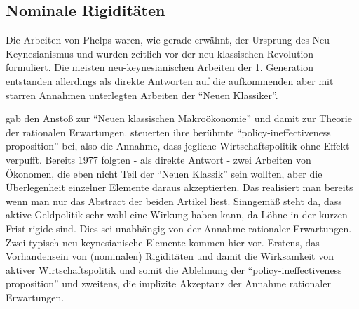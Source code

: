\subsection{Nominale Rigiditäten}
\label{Nominale Rigiditäten}

Die Arbeiten von Phelps waren, wie gerade erwähnt, der Ursprung des Neu-Keynesianismus und wurden zeitlich vor der neu-klassischen Revolution formuliert. Die meisten neu-keynesianischen Arbeiten der 1. Generation entstanden allerdings als direkte Antworten auf die aufkommenden aber mit starren Annahmen unterlegten Arbeiten der "`Neuen Klassiker"'.

\textcite{Lucas1976} gab den Anstoß zur "`Neuen klassischen Makroökonomie"' und damit zur Theorie der rationalen Erwartungen. \textcite{Sargent1975} steuerten ihre berühmte "`policy-ineffectiveness proposition"' bei, also die Annahme, dass jegliche Wirtschaftspolitik ohne Effekt verpufft. Bereits 1977 folgten - als direkte Antwort - zwei Arbeiten \textcite{Taylor1977, Fischer1977} von Ökonomen, die eben nicht Teil der "`Neuen Klassik"' sein wollten, aber die Überlegenheit einzelner Elemente daraus akzeptierten. Das realisiert man bereits wenn man nur das Abstract der beiden Artikel liest. Sinngemäß steht da, dass aktive Geldpolitik sehr wohl eine Wirkung haben kann, da Löhne in der kurzen Frist rigide sind. Dies sei unabhängig von der Annahme rationaler Erwartungen. Zwei typisch neu-keynesianische Elemente kommen hier vor. Erstens, das Vorhandensein von (nominalen) Rigiditäten und damit die Wirksamkeit von aktiver Wirtschaftspolitik und somit die Ablehnung der "`policy-ineffectiveness proposition"' und zweitens, die implizite Akzeptanz der Annahme rationaler Erwartungen.
